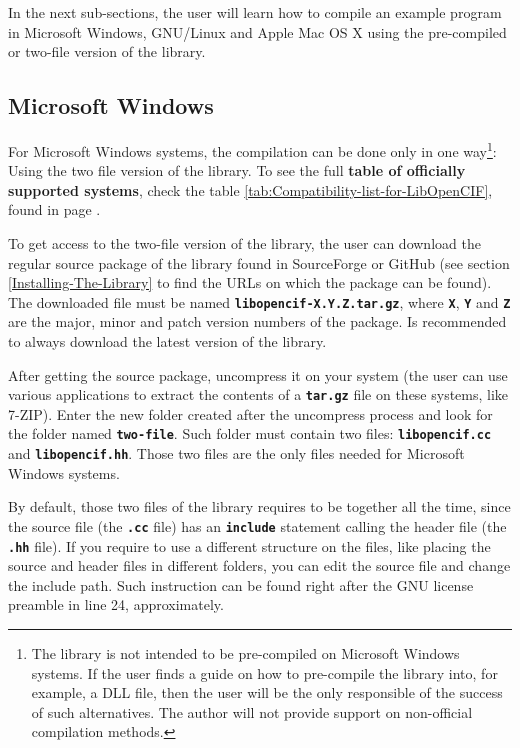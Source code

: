 \documentclass[11pt,twoside,openany,x11names,svgnames]{memoir}
\begin{document}
In the next sub-sections, the user will learn how to compile an example program in Microsoft Windows, GNU/Linux and Apple Mac OS X using the pre-compiled or two-file version of the library.

\subsection{Microsoft Windows}\label{Compiling-On-Windows}
 
For Microsoft Windows systems, the compilation can be done only in one way\footnote{The library is not intended to be pre-compiled on Microsoft Windows systems. If the user finds a guide on how to pre-compile the library into, for example, a DLL file, then the user will be the only responsible of the success of such alternatives. The author will not provide support on non-official compilation methods.}: Using the two file version of the library. To see the full \textbf{table of officially supported systems}, check the table \ref{tab:Compatibility-list-for-LibOpenCIF}, found in page \pageref{tab:Compatibility-list-for-LibOpenCIF}.

To get access to the two-file version of the library, the user can download the regular source package of the library found in SourceForge or GitHub (see section \ref{Installing-The-Library} to find the URLs on which the package can be found). The downloaded file must be named \textbf{\texttt{libopencif-X.Y.Z.tar.gz}}, where \textbf{\texttt{X}}, \textbf{\texttt{Y}} and \textbf{\texttt{Z}} are the major, minor and patch version numbers of the package. Is recommended to always download the latest version of the library.

After getting the source package, uncompress it on your system (the user can use various applications to extract the contents of a \textbf{\texttt{tar.gz}} file on these systems, like 7-ZIP). Enter the new folder created after the uncompress process and look for the folder named \textbf{\texttt{two-file}}. Such folder must contain two files: \textbf{\texttt{libopencif.cc}} and \textbf{\texttt{libopencif.hh}}. Those two files are the only files needed for Microsoft Windows systems.

By default, those two files of the library requires to be together all the time, since the source file (the \textbf{\texttt{.cc}} file) has an \textbf{\texttt{include}} statement calling the header file (the \textbf{\texttt{.hh}} file). If you require to use a different structure on the files, like placing the source and header files in different folders, you can edit the source file and change the include path. Such instruction can be found right after the GNU license preamble in line 24, approximately.
\end{document}
